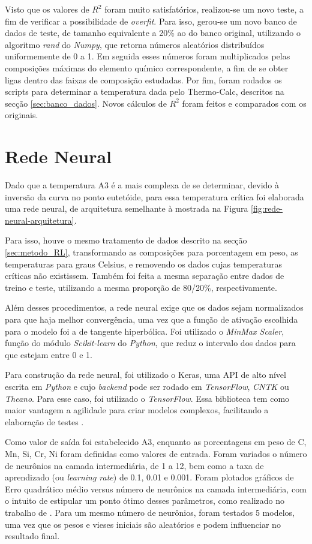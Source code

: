 \documentclass[brazil,tf,epusp]{usp}  %
\begin{document}
Visto que os valores de $R^{2}$ foram muito satisfatórios, realizou-se um novo teste, a fim de verificar a possibilidade de \textit{overfit}. Para isso, gerou-se um novo banco de dados de teste, de tamanho equivalente a 20\% ao do banco original, utilizando o algoritmo \textit{rand} do \textit{Numpy}, que retorna números aleatórios distribuídos uniformemente de 0 a 1. Em seguida esses números foram multiplicados pelas composições máximas do elemento químico correspondente, a fim de se obter ligas dentro das faixas de composição estudadas. Por fim, foram rodados os scripts para determinar a temperatura dada pelo Thermo-Calc\textregistered{}, descritos na secção \ref{sec:banco_dados}. Novos cálculos de $R^{2}$ foram feitos e comparados com os originais.

\section{Rede Neural}
Dado que a temperatura A3 é a mais complexa de se determinar, devido à inversão da curva no ponto eutetóide, para essa temperatura crítica foi elaborada uma rede neural, de arquitetura semelhante à mostrada na Figura \ref{fig:rede-neural-arquitetura}.

Para isso, houve o mesmo tratamento de dados descrito na secção \ref{sec:metodo_RL}, transformando as composições para porcentagem em peso, as temperaturas para graus Celsius, e removendo os dados cujas temperaturas críticas não existissem. Também foi feita a mesma separação entre dados de treino e teste, utilizando a mesma proporção de 80/20\%, respectivamente.

Além desses procedimentos, a rede neural exige que os dados sejam normalizados para que haja melhor convergência, uma vez que a função de ativação escolhida para o modelo foi a de tangente hiperbólica. Foi utilizado o \textit{MinMax Scaler}, função do módulo \textit{Scikit-learn} do \textit{Python}, que reduz o intervalo dos dados para que estejam entre 0 e 1.

Para construção da rede neural, foi utilizado o Keras, uma API de alto nível escrita em \textit{Python} e cujo
\textit{backend} pode ser rodado em \textit{TensorFlow}, \textit{CNTK} ou \textit{Theano}. Para esse caso, foi utilizado o \textit{TensorFlow}. Essa biblioteca tem como maior vantagem a agilidade para criar modelos complexos, facilitando a elaboração de testes \cite{Skalski2017}.

Como valor de saída foi estabelecido A3, enquanto as porcentagens em peso de C, Mn, Si, Cr, Ni foram definidas como valores de entrada. Foram variados o número de neurônios na camada intermediária, de 1 a 12, bem como a taxa de aprendizado (ou \textit{learning rate}) de 0.1, 0.01 e 0.001. Foram plotados gráficos de Erro quadrático médio versus número de neurônios na camada intermediária, com o intuito de estipular um ponto ótimo desses parâmetros, como realizado no trabalho de . Para um mesmo número de neurônios, foram testados 5 modelos, uma vez que os pesos e vieses iniciais são aleatórios e podem influenciar no resultado final.
\end{document}
